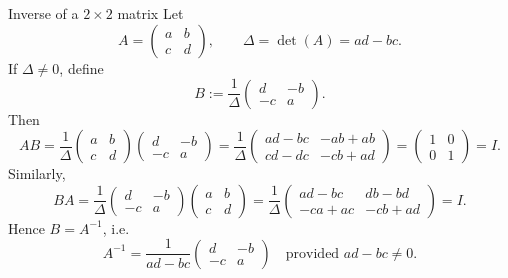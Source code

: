 \documentclass[9pt]{beamer}
\begin{document}
\begin{frame}{Inverse of a $2\times 2$ matrix}
\small
Let 
\[
A=\begin{pmatrix}a&b\\ c&d\end{pmatrix},\qquad \Delta=\det(A)=ad-bc.
\]
If $\Delta\neq 0$, define
\[
B:=\frac{1}{\Delta}\begin{pmatrix}d&-b\\ -c&a\end{pmatrix}.
\]
Then
\[
AB=\frac{1}{\Delta}
\begin{pmatrix}
a&b\\ c&d
\end{pmatrix}
\begin{pmatrix}
d&-b\\ -c&a
\end{pmatrix}
=
\frac{1}{\Delta}
\begin{pmatrix}
ad-bc&-ab+ab\\ cd-dc&-cb+ad
\end{pmatrix}
=
\begin{pmatrix}
1&0\\ 0&1
\end{pmatrix}=I.
\]
Similarly,
\[
BA=\frac{1}{\Delta}
\begin{pmatrix}
d&-b\\ -c&a
\end{pmatrix}
\begin{pmatrix}
a&b\\ c&d
\end{pmatrix}
=
\frac{1}{\Delta}
\begin{pmatrix}
ad-bc&db-bd\\ -ca+ac&-cb+ad
\end{pmatrix}
=I.
\]
Hence $B=A^{-1}$, i.e.
\[
\boxed{
A^{-1}=\frac{1}{ad-bc}\begin{pmatrix}d&-b\\ -c&a\end{pmatrix}
}\quad\text{provided }ad-bc\neq 0.
\]

\end{frame}


        
        
\end{document}
